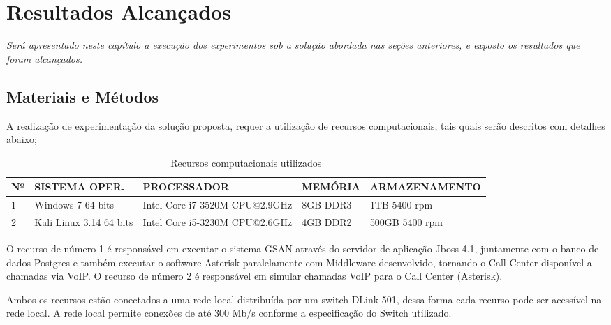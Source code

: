 \chapter[Resultados Alcançados]{\textbf{R}esultados \textbf{A}lcançados}

\textit{Será apresentado neste capítulo a execução dos experimentos sob a solução abordada nas seções anteriores, e exposto os resultados que foram alcançados.}

\section{Materiais e Métodos}

A realização de experimentação da solução proposta, requer a utilização de recursos computacionais, tais quais serão descritos com detalhes abaixo;

\begin{table}[htb]
	\footnotesize
	\caption{Recursos computacionais utilizados}
	\label{tabela:recursosUtilizados}
	\begin{tabular}{|p{0.5cm}|p{3.5cm}|p{3cm}|p{2cm}|p{4cm}|} \hline
		\textbf{Nº} & \textbf{SISTEMA OPER.} 	& \textbf{PROCESSADOR} 				& \textbf{MEMÓRIA} 	& \textbf{ARMAZENAMENTO}  \\ \hline
		1 			& Windows 7 64 bits 		& Intel Core i7-3520M CPU@2.9GHz 	& 8GB DDR3			& 1TB 5400 rpm \\ \hline
		2 			& Kali Linux 3.14 64 bits 	& Intel Core i5-3230M CPU@2.6GHz	& 4GB DDR2			& 500GB 5400 rpm \\ \hline
	\end{tabular}
\end{table}

O recurso de número 1 é responsável em executar o sistema GSAN através do servidor de aplicação Jboss 4.1, juntamente com o banco de dados Postgres e também executar o software Asterisk paralelamente com Middleware desenvolvido, tornando o Call Center disponível a chamadas via VoIP.
O recurso de número 2 é responsável em simular chamadas VoIP para o Call Center (Asterisk).	


Ambos os recursos estão conectados a uma rede local distribuída por um switch DLink 501, dessa forma cada recurso pode ser acessível na rede local. A rede local permite conexões de até 300 Mb/s conforme a especificação do Switch utilizado.


